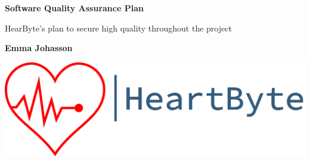 \begin{titlepage}
   \begin{center}
       \vspace*{1cm}
        \Huge
       \textbf{Software Quality Assurance Plan}
        
        \Large
       \vspace{0.5cm}
        HearByte's plan to secure high quality throughout the project
            
       \vspace{1.5cm}

       \textbf{Emma Johasson}

       \vfill
            
     
     \date{October 2020}

            
      \vfill
\includegraphics[width=\linewidth]{Pictures/logo_heartbyte_transparent_v_1_1 (1)}

    \vfill
            
   \end{center}
\end{titlepage}
